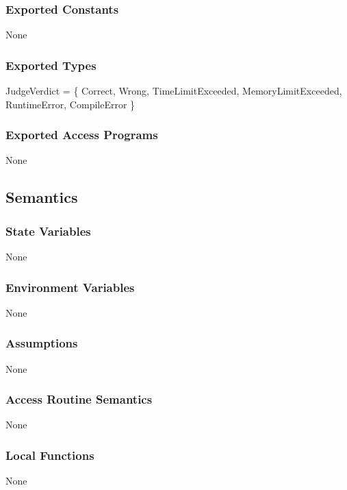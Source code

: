 \documentclass[12pt, titlepage]{article}
\begin{document}
\subsubsection{Exported Constants}

None

\subsubsection{Exported Types}

JudgeVerdict = \{ Correct, Wrong, TimeLimitExceeded, MemoryLimitExceeded, \\RuntimeError, CompileError \} 

\subsubsection{Exported Access Programs}

None

\subsection{Semantics}

\subsubsection{State Variables}

None

\subsubsection{Environment Variables}

None

\subsubsection{Assumptions}

None

\subsubsection{Access Routine Semantics}

None

\subsubsection{Local Functions}

None
\end{document}
